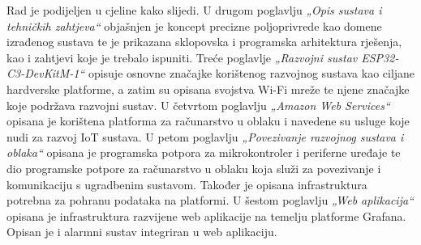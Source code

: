 Rad je podijeljen u cjeline kako slijedi. U drugom poglavlju \textit{„Opis sustava i tehničkih zahtjeva“} objašnjen je koncept precizne poljoprivrede kao domene izrađenog sustava te je prikazana sklopovska i programska arhitektura rješenja, kao i zahtjevi koje je trebalo ispuniti. Treće poglavlje \textit{„Razvojni sustav ESP32-C3-DevKitM-1“} opisuje osnovne značajke korištenog razvojnog sustava kao ciljane hardverske platforme, a zatim su opisana svojstva Wi-Fi mreže te njene značajke koje podržava razvojni sustav. U četvrtom poglavlju \textit{„Amazon Web Services“} opisana je korištena platforma za računarstvo u oblaku i navedene su usluge koje nudi za razvoj IoT sustava. U petom poglavlju \textit{„Povezivanje razvojnog sustava i oblaka“} opisana je programska potpora za mikrokontroler i periferne uređaje te dio programske potpore za računarstvo u oblaku koja služi za povezivanje i komunikaciju s ugradbenim sustavom. Također je opisana infrastruktura potrebna za pohranu podataka na platformi. U šestom poglavlju \textit{„Web aplikacija“} opisana je infrastruktura razvijene web aplikacije na temelju platforme Grafana. Opisan je i alarmni sustav integriran u web aplikaciju.

\eject